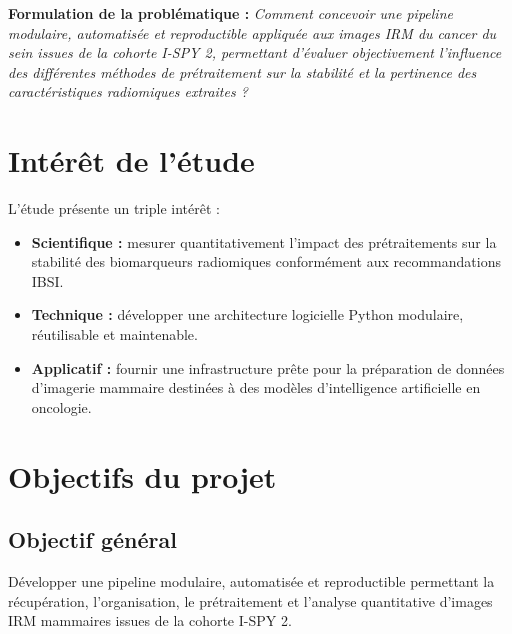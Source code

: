 \documentclass[12pt,a4paper]{report}
\begin{document}
    \textbf{Formulation de la problématique :} \textit{Comment concevoir une pipeline modulaire, automatisée et reproductible appliquée aux images IRM du cancer du sein issues de la cohorte I-SPY 2, permettant d'évaluer objectivement l'influence des différentes méthodes de prétraitement sur la stabilité et la pertinence des caractéristiques radiomiques extraites ?}

    \section{Intérêt de l'étude}
    
    L'étude présente un triple intérêt :
    \begin{itemize}
        \item \textbf{Scientifique :} mesurer quantitativement l'impact des prétraitements sur la stabilité des biomarqueurs radiomiques conformément aux recommandations IBSI.
        \item \textbf{Technique :} développer une architecture logicielle Python modulaire, réutilisable et maintenable.
        \item \textbf{Applicatif :} fournir une infrastructure prête pour la préparation de données d'imagerie mammaire destinées à des modèles d'intelligence artificielle en oncologie.
    \end{itemize}

    \section{Objectifs du projet}
    
    \subsection{Objectif général}
    Développer une pipeline modulaire, automatisée et reproductible permettant la récupération, l'organisation, le prétraitement et l'analyse quantitative d'images IRM mammaires issues de la cohorte I-SPY 2.
\end{document}
